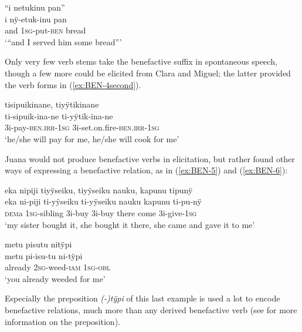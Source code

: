  \newpage
\ea\label{ex:BEN-3}
\begingl
\glpreamble “i netukinu pan”\\
\gla i nÿ-etuk-inu pan\\
\glb and 1\textsc{sg}-put-\textsc{ben} bread\\
\glft ‘“and I served him some bread”’
\endgl
\trailingcitation{[jxx-e150925l-1.129]}%
\xe
{}

Only very few verb stems take the benefactive suffix in spontaneous speech, though a few more could be elicited from Clara and Miguel; the latter provided the verb forms in (\ref{ex:BEN-4second}).

\ea\label{ex:BEN-4second}
\begingl
\glpreamble tisipuikinane, tiyÿtikinane\\
\gla ti-sipuik-ina-ne ti-yÿtik-ina-ne\\
\glb 3i-pay-\textsc{ben.irr}-1\textsc{sg} 3i-set.on.fire-\textsc{ben.irr}-1\textsc{sg}\\
\glft ‘he/she will pay for me, he/she will cook for me'
\endgl
\trailingcitation{[mxx-e181024l]}
\xe{}

Juana would not produce benefactive verbs in elicitation, but rather found other ways of expressing a benefactive relation, as in (\ref{ex:BEN-5}) and (\ref{ex:BEN-6}):

\ea\label{ex:BEN-5}
\begingl
\glpreamble eka nipiji tiyÿseiku, tiyÿseiku nauku, kapunu tipunÿ\\
\gla eka ni-piji ti-yÿseiku ti-yÿseiku nauku kapunu ti-pu-nÿ\\
\glb \textsc{dem}a 1\textsc{sg}-sibling 3i-buy 3i-buy there come 3i-give-1\textsc{sg}\\
\glft ‘my sister bought it, she bought it there, she came and gave it to me’
\endgl
\trailingcitation{[jxx-e191021e-2]}
\xe

\ea\label{ex:BEN-6}
\begingl
\glpreamble metu pisutu nitÿpi\\
\gla metu pi-isu-tu ni-tÿpi\\
\glb already 2\textsc{sg}-weed-\textsc{iam} 1\textsc{sg}-\textsc{obl}\\
\glft ‘you already weeded for me’
\endgl
\trailingcitation{[jxx-e191021e-2]}
\xe

Especially the  preposition \textit{(-)tÿpi} of this last example is used a lot to encode benefactive relations, much more than any derived benefactive verb (see  for more information on the preposition).


